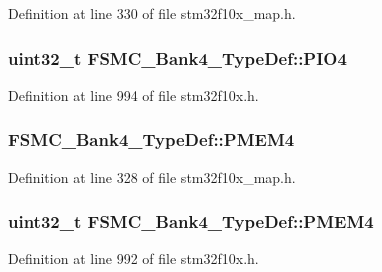 Definition at line 330 of file stm32f10x\+\_\+map.\+h.

\subsubsection[{\texorpdfstring{P\+I\+O4}{PIO4}}]{ {\bf uint32\+\_\+t} F\+S\+M\+C\+\_\+\+Bank4\+\_\+\+Type\+Def\+::\+P\+I\+O4}\hypertarget{struct_f_s_m_c___bank4___type_def_a531ebc38c47bebfb198eafb4de24cb2a}{}\label{struct_f_s_m_c___bank4___type_def_a531ebc38c47bebfb198eafb4de24cb2a}


Definition at line 994 of file stm32f10x.\+h.

\subsubsection[{\texorpdfstring{P\+M\+E\+M4}{PMEM4}}]{ F\+S\+M\+C\+\_\+\+Bank4\+\_\+\+Type\+Def\+::\+P\+M\+E\+M4}\hypertarget{struct_f_s_m_c___bank4___type_def_afd50706501facd4259b8aa7f85afaeae}{}\label{struct_f_s_m_c___bank4___type_def_afd50706501facd4259b8aa7f85afaeae}


Definition at line 328 of file stm32f10x\+\_\+map.\+h.

\subsubsection[{\texorpdfstring{P\+M\+E\+M4}{PMEM4}}]{ {\bf uint32\+\_\+t} F\+S\+M\+C\+\_\+\+Bank4\+\_\+\+Type\+Def\+::\+P\+M\+E\+M4}\hypertarget{struct_f_s_m_c___bank4___type_def_a4ed4ce751e7a8b3207bd20675b1d9085}{}\label{struct_f_s_m_c___bank4___type_def_a4ed4ce751e7a8b3207bd20675b1d9085}


Definition at line 992 of file stm32f10x.\+h.


